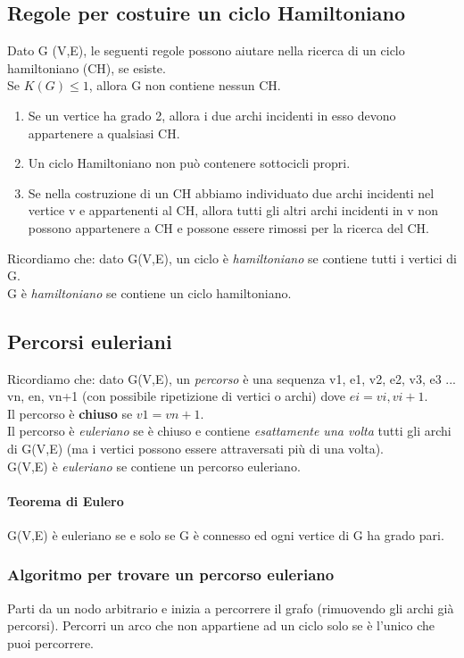 \subsection{Regole per costuire un ciclo Hamiltoniano}
Dato G (V,E), le seguenti regole possono aiutare nella ricerca di un ciclo hamiltoniano (CH), se
esiste. \\
Se \( K(G) \leq 1\), allora G non contiene nessun CH.\\
\begin{enumerate}
    \item Se un vertice ha grado 2, allora i due archi incidenti in esso devono appartenere a qualsiasi CH.
    \item Un ciclo Hamiltoniano non può contenere sottocicli propri.
    \item Se nella costruzione di un CH abbiamo individuato due archi incidenti nel vertice v e
    appartenenti al CH, allora tutti gli altri archi incidenti in v non possono appartenere a CH e
    possone essere rimossi per la ricerca del CH.
\end{enumerate}
Ricordiamo che: dato G(V,E), un ciclo è \emph{hamiltoniano} se contiene
tutti i vertici di G. \\ 
G è \emph{hamiltoniano} se contiene un ciclo hamiltoniano.\\ 

\noindent
\subsection{Percorsi euleriani}
Ricordiamo che: dato G(V,E), un \emph{percorso} è una sequenza v1, e1, v2, e2, v3, e3 ... vn, en, vn+1 (con possibile
ripetizione di vertici o archi) dove \(ei=vi,vi+1\). \\ 
Il percorso è \textbf{chiuso} se \(v1=vn+1\).\\ 
Il percorso è \emph{euleriano} se è chiuso e contiene \emph{esattamente una volta} tutti gli archi di G(V,E) (ma i vertici
possono essere attraversati più di una volta). \\ 
G(V,E) è \emph{euleriano} se contiene un percorso euleriano. 
\paragraph{Teorema di Eulero} G(V,E) è euleriano se e solo se G è connesso ed ogni vertice di G ha grado pari. 
\subsubsection{Algoritmo per trovare un percorso euleriano}
Parti da un nodo
arbitrario e inizia a percorrere il grafo (rimuovendo gli archi già percorsi). Percorri un arco che non
appartiene ad un ciclo solo se è l'unico che puoi percorrere. \\

